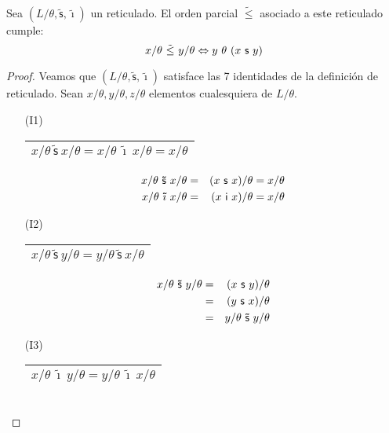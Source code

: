   \begin{lemma}
    \PN Sea $(L/\theta, \mathsf{\tilde{s}}, \mathsf{\tilde{\imath}})$ un reticulado. El orden parcial $\tilde{\leq}$
    asociado a este reticulado cumple:
    \[
      x/\theta \ \tilde{\leq} \ y/\theta \Leftrightarrow y \ \theta \ (x \ \SU \ y)
    \]
  \end{lemma}
  \begin{proof}
    \PN Veamos que $(L/\theta, \mathsf{\tilde{s}}, \mathsf{\tilde{\imath}})$ satisface las 7 identidades de la
    definición de reticulado. Sean $x/\theta, y/\theta, z/\theta$ elementos cualesquiera de $L/\theta$.
    \begin{multicols}{2}
      \begin{enumerate}
        \item[(I1)] \begin{tabular}{|c|} \hline $x/\theta \ \mathsf{\tilde{s}} \ x/\theta = x/\theta \
          \mathsf{\tilde{\imath}} \ x/\theta = x/\theta$ \\\hline \end{tabular}
          \begin{eqnarray*}
            x/\theta \ \mathsf{\tilde{s}} \ x/\theta &=& (x \ \SU \ x)/\theta = x /\theta \\
            x/\theta \ \mathsf{\tilde{\imath}} \ x/\theta &=& (x \ \IN \ x)/\theta = x /\theta
          \end{eqnarray*}
        \item[(I2)] \begin{tabular}{|c|} \hline $x/\theta \ \mathsf{\tilde{s}} \ y/\theta = y/\theta \
          \mathsf{\tilde{s}} \ x/\theta$ \\\hline \end{tabular}
          \begin{eqnarray*}
            x/\theta \ \mathsf{\tilde{s}} \ y/\theta &=& (x \ \SU \ y)/\theta \\
            &=& (y \ \SU \ x)/\theta \\
            &=& y/\theta \ \mathsf{\tilde{s}} \ y/\theta
          \end{eqnarray*}
        \item[(I3)] \begin{tabular}{|c|} \hline $x/\theta \ \mathsf{\tilde{\imath}} \ y/\theta = y/\theta \
          \mathsf{\tilde{\imath}} \ x/\theta$ \\\hline \end{tabular}
          \begin{eqnarray*}

\end{eqnarray*}
\end{enumerate}
\end{multicols}
\end{proof}
